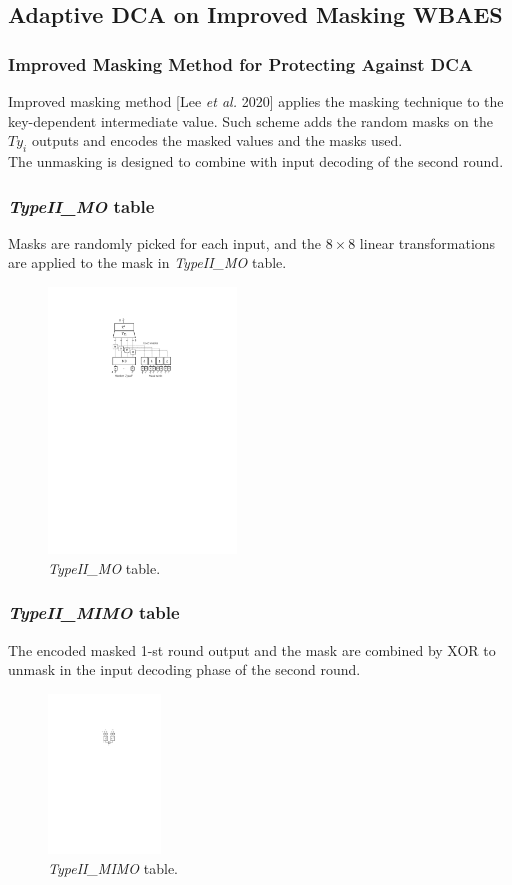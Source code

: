 \documentclass{beamer}
\begin{document}
\subsection{Adaptive DCA on Improved Masking WBAES}

\frame
{
	\frametitle{Improved Masking Method for Protecting Against DCA}
	Improved masking method [Lee \textit{et al.} 2020] applies the masking technique to the key-dependent intermediate value. Such scheme adds the random masks on the $Ty_i$ outputs and encodes the masked values and the masks used.
	\\[2ex]
	The unmasking is designed to combine with input decoding of the second round.
}

\frame
{
	\frametitle{\textit{TypeII\_MO} table}
	Masks are randomly picked for each input, and the $8\times 8$ linear transformations are applied to the mask in \textit{TypeII\_MO} table.
	\begin{figure}
		\centering
		\includegraphics[width=5cm]{./pics/IIMO.pdf}
		\caption{\textit{TypeII\_MO} table.}
	\end{figure}
}

\frame
{
	\frametitle{\textit{TypeII\_MIMO} table}
	The encoded masked 1-st round output and the mask are combined by XOR to unmask in the input decoding phase of the second round.
	\begin{figure}
		\centering
		\includegraphics[width=3.0cm]{./pics/IIMIMO.pdf}
		\caption{\textit{TypeII\_MIMO} table.}
	\end{figure}
}
\end{document}
